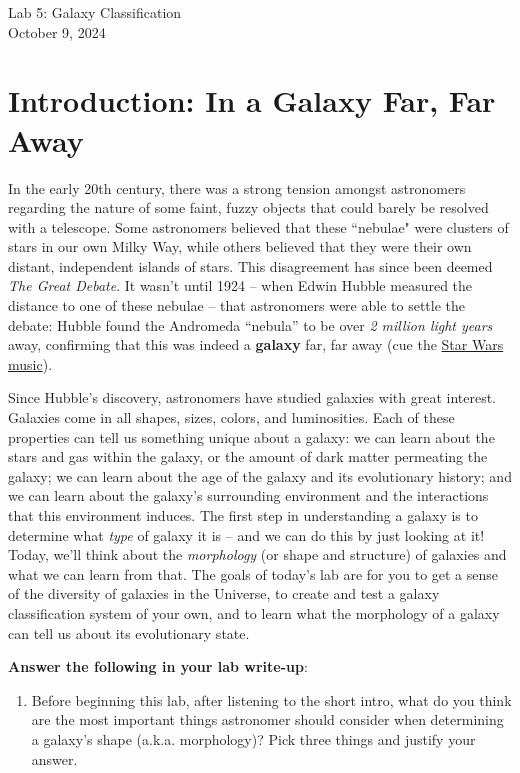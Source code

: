 \documentclass[11pt]{article}
\begin{document}
\begin{center}
\huge{Lab 5: Galaxy Classification}\\ \medskip \Large{October 9, 2024}
\end{center}

\section{Introduction: In a Galaxy Far, Far Away}
In the early 20th century, there was a strong tension amongst astronomers regarding the nature of some faint, fuzzy objects that could barely be resolved with a telescope. Some astronomers believed that these ``nebulae" were clusters of stars in our own Milky Way, while others believed that they were their own distant, independent islands of stars. This disagreement has since been deemed \textit{The Great Debate}. It wasn't until 1924 -- when Edwin Hubble measured the distance to one of these nebulae -- that astronomers were able to settle the debate: Hubble found the Andromeda ``nebula'' to be over \emph{2 million light years} away, confirming that this was indeed a \textbf{galaxy} far, far away (cue the \href{https://www.youtube.com/watch?v=MNMSAIG0dfQ}{Star Wars music}).


\medskip
Since Hubble's discovery, astronomers have studied galaxies with great interest. Galaxies come in all shapes, sizes, colors, and luminosities.  Each of these properties can tell us something unique about a galaxy: we can learn about the stars and gas within the galaxy, or the amount of dark matter permeating the galaxy; we can learn about the age of the galaxy and its evolutionary history; and we can learn about the galaxy's surrounding environment and the interactions that this environment induces. The first step in understanding a galaxy is to determine what \emph{type} of galaxy it is -- and we can do this by just looking at it!  Today, we'll think about the \textit{morphology} (or shape and structure) of galaxies and what we can learn from that. The goals of today's lab are for you to get a sense of the diversity of galaxies in the Universe, to create and test a galaxy classification system of your own, and to learn what the morphology of a galaxy can tell us about its evolutionary state.

\medskip
\textbf{Answer the following in your lab write-up}:

\begin{enumerate}
\setcounter{enumi}{0}

    \item Before beginning this lab, after listening to the short intro, what do you think are the most important things astronomer should consider when determining a galaxy's shape (a.k.a. morphology)? Pick three things and justify your answer. 
    
\end{enumerate}
\medskip
\end{document}
